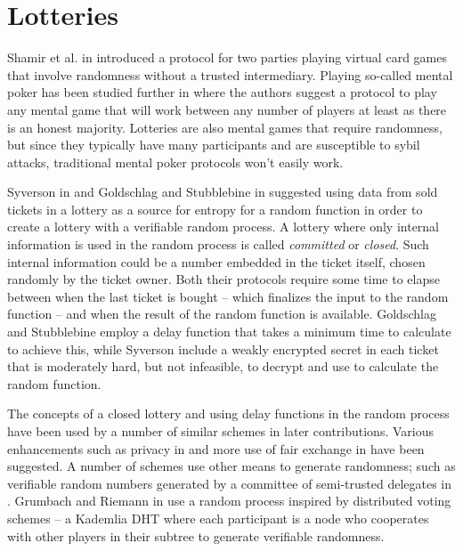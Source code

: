 \section{Lotteries}
\label{sec:lotteries}

Shamir et al. in \cite{shamir_mental_1981} introduced a protocol for two parties playing virtual card games that involve randomness without a trusted intermediary. Playing so-called mental poker has been studied further in \cite{goldreich_how_1987} where the authors suggest a protocol to play any mental game that will work between any number of players at least as there is an honest majority. Lotteries are also mental games that require randomness, but since they typically have many participants and are susceptible to sybil attacks, traditional mental poker protocols won't easily work.

Syverson in \cite{syverson_weakly_1998} and Goldschlag and Stubblebine in \cite{goldschlag_publicly_1998} suggested using data from sold tickets in a lottery as a source for entropy for a random function in order to create a lottery with a verifiable random process. A lottery where only internal information is used in the random process is called \emph{committed} or \emph{closed}. Such internal information could be a number embedded in the ticket itself, chosen randomly by the ticket owner. Both their protocols require some time to elapse between when the last ticket is bought – which finalizes the input to the random function – and when the result of the random function is available. Goldschlag and Stubblebine employ a delay function that takes a minimum time to calculate to achieve this, while Syverson include a weakly encrypted secret in each ticket that is moderately hard, but not infeasible, to decrypt and use to calculate the random function.

The concepts of a closed lottery and using delay functions in the random process have been used by a number of similar schemes in later contributions. Various enhancements such as privacy in \cite{zhou_playing_2001} and more use of fair exchange in \cite{chow_e-lottery_2005} have been suggested. A number of schemes use other means to generate randomness; such as verifiable random numbers generated by a committee of semi-trusted delegates in \cite{fouque_sharing_2001, lee_design_2009, liu_improved_2014, xia_information_2019}. Grumbach and Riemann in \cite{grumbach_distributed_2017} use a random process inspired by distributed voting schemes – a Kademlia DHT where each participant is a node who cooperates with other players in their subtree to generate verifiable randomness. 

